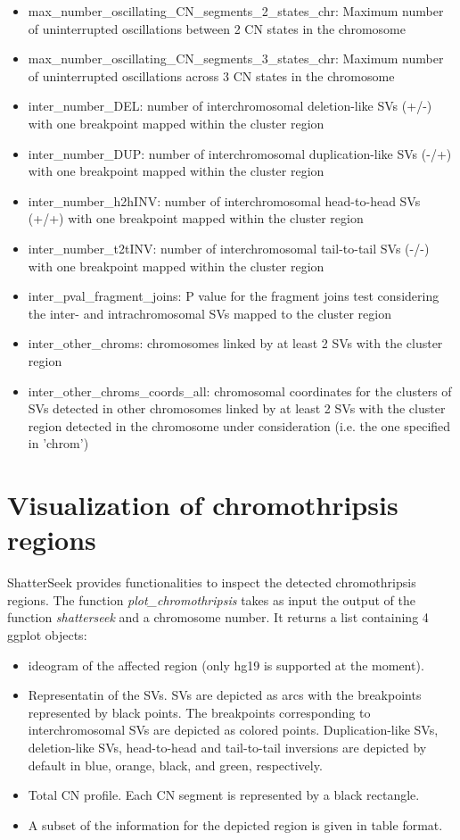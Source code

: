 \documentclass[twoside,a4wide,11pt]{article}\usepackage[]{graphicx}\usepackage[]{color}
\begin{document}
\begin{itemize}
\item max\_number\_oscillating\_CN\_segments\_2\_states\_chr: Maximum number of uninterrupted oscillations between 2 CN states in the chromosome
\item max\_number\_oscillating\_CN\_segments\_3\_states\_chr: Maximum number of uninterrupted oscillations across 3 CN states in the chromosome
\item inter\_number\_DEL: number of interchromosomal deletion-like SVs (+/-) with one breakpoint mapped within the cluster region
\item inter\_number\_DUP: number of interchromosomal duplication-like SVs (-/+) with one breakpoint mapped within the cluster region
\item inter\_number\_h2hINV: number of interchromosomal head-to-head SVs (+/+) with one breakpoint mapped within the cluster region
\item inter\_number\_t2tINV: number of interchromosomal tail-to-tail SVs (-/-) with one breakpoint mapped within the cluster region
\item inter\_pval\_fragment\_joins: P value for the fragment joins test considering the inter- and intrachromosomal SVs mapped to the cluster region
\item inter\_other\_chroms: chromosomes linked by at least 2 SVs with the cluster region
\item inter\_other\_chroms\_coords\_all: chromosomal coordinates for the clusters of SVs detected in other chromosomes linked by at least 2 SVs with the cluster region detected in the chromosome under consideration (i.e. the one specified in 'chrom')
\end{itemize}






\section{Visualization of chromothripsis regions}

ShatterSeek provides functionalities to inspect the detected chromothripsis regions. 
The function {\it plot\_chromothripsis} takes as input the output of the function 
{\it shatterseek} and a chromosome number. 
It returns a list containing 4 ggplot objects:
\begin{itemize}
\item ideogram of the affected region (only hg19 is supported at the moment). 
\item Representatin of the SVs. SVs are depicted as arcs with the breakpoints represented by black points. 
The breakpoints corresponding to interchromosomal SVs are depicted as colored points.
Duplication-like SVs, deletion-like SVs, head-to-head and tail-to-tail inversions are depicted by default in blue, orange, black, and green, respectively.
\item Total CN profile. Each CN segment is represented by a black rectangle.
\item A subset of the information for the depicted region is given in table format.
\end{itemize} 
\end{document}
